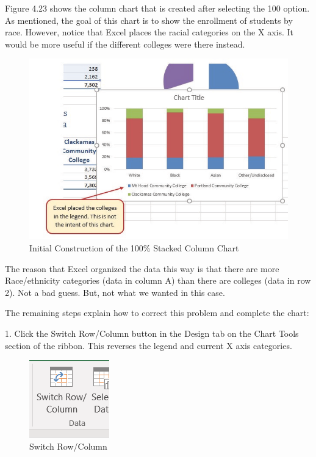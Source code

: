 Figure 4.23 shows the column chart that is created after selecting the 100%
option. As mentioned, the goal of this chart is to show the enrollment of students by race. However,
notice that Excel places the racial categories on the X axis. It would be more useful if the different
colleges were there instead.



\begin{figure}[H]
	\centering
	\includegraphics[width=\maxwidth{.95\linewidth}]{gfx/ch04_fig24}
	\caption{Initial Construction of the 100\% Stacked Column Chart}
	\label{04:fig24}
\end{figure}





The reason that Excel organized the data this way is that there are more Race/ethnicity categories
(data in column A) than there are colleges (data in row 2). Not a bad guess. But, not what we wanted
in this case.

The remaining steps explain how to correct this problem and complete the chart:

1. Click the Switch Row/Column button in the Design tab on the Chart Tools section of the
ribbon. This reverses the legend and current X axis categories.


\begin{figure}[H]
	\centering
	\includegraphics[width=\maxwidth{.95\linewidth}]{gfx/ch04_fig25}
	\caption{Switch Row/Column}
	\label{04:fig25}
\end{figure}





